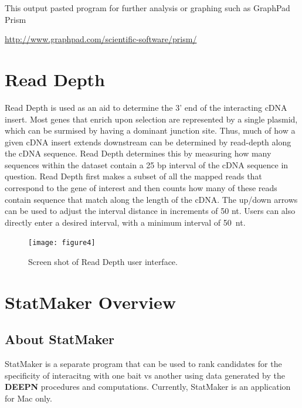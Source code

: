 \documentclass[11pt,fleqn]{book} %
\newcommand{\ReadDepth}{{\color{Bittersweet} Read Depth }}
\newcommand{\DEEPN}{\textbf{DEEPN }}
\newcommand{\StatMaker}{{\color{Dandelion} StatMaker }}
\begin{document}
This output pasted program for further analysis or graphing such as GraphPad Prism

\vspace{10pt}
\href{http://www.graphpad.com/scientific-software/prism/}{http://www.graphpad.com/scientific-software/prism/}

\chapter{\ReadDepth}

\ReadDepth is used as an aid to determine the 3’ end of the interacting cDNA insert.  Most genes that enrich upon selection are represented by a single plasmid, which can be surmised by having a dominant junction site.  Thus, much of how a given cDNA insert extends downstream can be determined by read-depth along the cDNA sequence. \ReadDepth determines this by measuring how many sequences within the dataset contain a 25 bp interval of the cDNA sequence in question. \ReadDepth first makes a subset of all the mapped reads that correspond to the gene of interest and then counts how many of these reads contain sequence that match along the length of the cDNA. 
The up/down arrows can be used to adjust the interval distance in increments of 50 nt.  Users can also directly enter a desired interval, with a minimum interval of 50~nt.

\begin{figure}[!ht]
    \centering
    \texttt{[image: figure4]}
    \caption{Screen shot of Read Depth user interface.}
    \label{fig:blast_query_screen_shot2}
\end{figure}

\cleardoublepage


\chapter{StatMaker Overview}

\section{About StatMaker}
\StatMaker is a separate program that can be used to rank candidates for the specificity of interacitng with one bait vs another using data generated by the \DEEPN procedures and computations. Currently, StatMaker is an application for Mac only.
\end{document}

